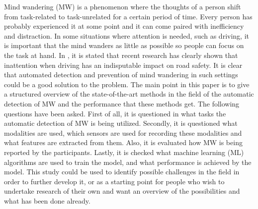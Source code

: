Mind wandering (MW) is a phenomenon where the thoughts of a person shift from task-related to task-unrelated for a certain period of time. Every person has probably experienced it at some point and it can come paired with inefficiency and distraction. In some situations where attention is needed, such as driving, it is important that the mind wanders as little as possible so people can focus on the task at hand. In \cite{berthie2015restless}, it is stated that recent research has clearly shown that inattention when driving has an indisputable impact on road safety. It is clear that automated detection and prevention of mind wandering in such settings could be a good solution to the problem. The main point in this paper is to give a structured overview of the state-of-the-art methods in the field of the automatic detection of MW and the performance that these methods get. The following questions have been asked. First of all, it is questioned in what tasks the automatic detection of MW is being utilized. Secondly, it is questioned what modalities are used, which sensors are used for recording these modalities and what features are extracted from them. Also, it is evaluated how MW is being reported by the participants. Lastly, it is checked what machine learning (ML) algorithms are used to train the model, and what performance is achieved by the model. This study could be used to identify possible challenges in the field in order to further develop it, or as a starting point for people who wish to undertake research of their own and want an overview of the possibilities and what has been done already.